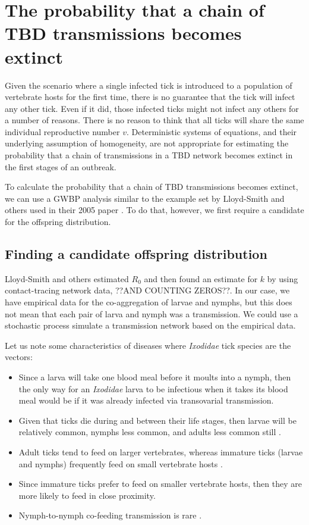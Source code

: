 \documentclass{article}
\begin{document}
\section{The probability that a chain of TBD transmissions becomes extinct}

Given the scenario where a single infected tick is introduced to a population of vertebrate hosts for the first time, there is no guarantee that the tick will infect any other tick. Even if it did, those infected ticks might not infect any others for a number of reasons. There is no reason to think that all ticks will share the same individual reproductive number $ v $. Deterministic systems of equations, and their underlying assumption of homogeneity, are not appropriate for estimating the probability that a chain of transmissions in a TBD network becomes extinct in the first stages of an outbreak.

To calculate the probability that a chain of TBD transmissions becomes extinct, we can use a GWBP analysis similar to the example set by Lloyd-Smith and others used in their 2005 paper \cite{LloydSmith2005}. To do that, however, we first require a candidate for the offspring distribution.

\subsection{Finding a candidate offspring distribution}

Lloyd-Smith and others estimated $ R_0 $ and then found an estimate for $ k $ by using contact-tracing network data, ??AND COUNTING ZEROS??. In our case, we have empirical data for the co-aggregation of larvae and nymphs, but this does not mean that each pair of larva and nymph was a transmission. We could use a stochastic process simulate a transmission network based on the empirical data. 

Let us note some characteristics of diseases where \textit{Ixodidae} tick species are the vectors:
\begin{itemize}
	\item Since a larva will take one blood meal before it moults into a nymph, then the only way for an \textit{Ixodidae} larva to be infectious when it takes its blood meal would be if it was already infected via transovarial transmission.
	\item Given that ticks die during and between their life stages, then larvae will be relatively common, nymphs less common, and adults less common still \cite{Randolph1998}.
	\item Adult ticks tend to feed on larger vertebrates, whereas immature ticks (larvae and nymphs) frequently feed on small vertebrate hosts \cite{Herrmann2015, Randolph1998}.
	\item Since immature ticks prefer to feed on smaller vertebrate hosts, then they are more likely to feed in close proximity.
	\item Nymph-to-nymph co-feeding transmission is rare \cite{VOORDOUW2014}.
\end{itemize}
\end{document}
